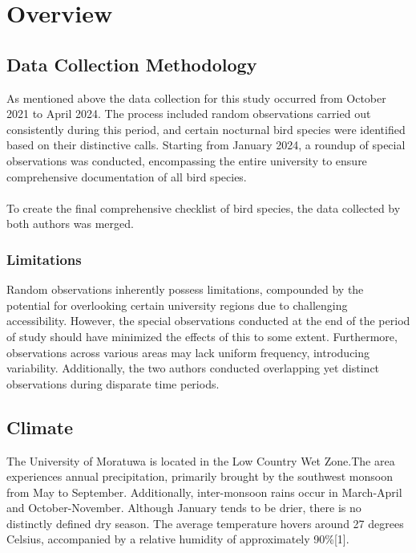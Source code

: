 \chapter{Overview}
\label{cp:overview}
\section{Data Collection Methodology}
As mentioned above the data collection for this study occurred from October 2021 to April 2024. The process included random observations carried out consistently during this period, and certain nocturnal bird species were identified based on their distinctive calls. Starting from January 2024, a roundup of special observations was conducted, encompassing the entire university to ensure comprehensive documentation of all bird species.
\\\\
To create the final comprehensive checklist of bird species, the data collected by both authors was merged.

\begin{importantbox}
\subsection{Limitations}
 Random observations inherently possess limitations, compounded by the potential for overlooking certain university regions due to challenging accessibility. However, the special observations conducted at the end of the period of study should have minimized the effects of this to some extent. Furthermore, observations across various areas may lack uniform frequency, introducing variability. Additionally, the two authors conducted overlapping yet distinct observations during disparate time periods.
\end{importantbox}

\section{Climate}
The University of Moratuwa is located in the Low Country Wet Zone.The area experiences annual precipitation, primarily brought by the southwest monsoon from May to September. Additionally, inter-monsoon rains occur in March-April and October-November. Although January tends to be drier, there is no distinctly defined dry season. The average temperature hovers around 27 degrees Celsius, accompanied by a relative humidity of approximately 90\%[1].

